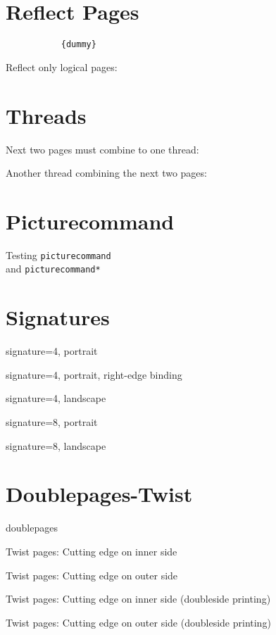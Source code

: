 \section{Reflect Pages}
\begingroup
\verb||
\verb|           {dummy}|

%
\verb||

%
Reflect only logical pages:\par
\verb||

\endgroup


\begingroup
\section{Threads}
Next two pages must combine to one thread:


Another thread combining the next two pages:


\endgroup

\section{Picturecommand}
\begingroup
Testing \texttt{picturecommand}\\ and \texttt{picturecommand*}

\endgroup

\section{Signatures}
\begingroup
signature=4, portrait

signature=4, portrait, right-edge binding

signature=4, landscape

signature=8, portrait

signature=8, landscape

\endgroup

\section{Doublepages-Twist}
\begingroup
doublepages

Twist pages: Cutting edge on inner side

Twist pages: Cutting edge on outer side

Twist pages: Cutting edge on inner side (doubleside printing)

Twist pages: Cutting edge on outer side (doubleside printing)

\endgroup


